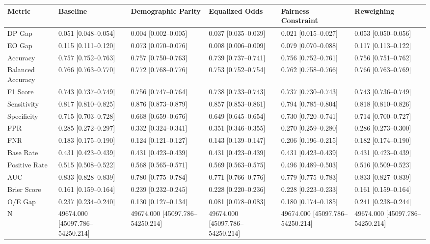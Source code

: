 \begin{tabular}{llllll}
\toprule
Metric & Baseline & Demographic Parity & Equalized Odds & Fairness Constraint & Reweighing \\
\midrule
DP Gap & 0.051 [0.048--0.054] & 0.004 [0.002--0.005] & 0.037 [0.035--0.039] & 0.021 [0.015--0.027] & 0.053 [0.050--0.056] \\
EO Gap & 0.115 [0.111--0.120] & 0.073 [0.070--0.076] & 0.008 [0.006--0.009] & 0.079 [0.070--0.088] & 0.117 [0.113--0.122] \\
Accuracy & 0.757 [0.752--0.763] & 0.757 [0.750--0.763] & 0.739 [0.737--0.741] & 0.756 [0.752--0.761] & 0.756 [0.751--0.762] \\
Balanced Accuracy & 0.766 [0.763--0.770] & 0.772 [0.768--0.776] & 0.753 [0.752--0.754] & 0.762 [0.758--0.766] & 0.766 [0.763--0.769] \\
F1 Score & 0.743 [0.737--0.749] & 0.756 [0.747--0.764] & 0.738 [0.733--0.743] & 0.737 [0.730--0.743] & 0.743 [0.736--0.749] \\
Sensitivity & 0.817 [0.810--0.825] & 0.876 [0.873--0.879] & 0.857 [0.853--0.861] & 0.794 [0.785--0.804] & 0.818 [0.810--0.826] \\
Specificity & 0.715 [0.703--0.728] & 0.668 [0.659--0.676] & 0.649 [0.645--0.654] & 0.730 [0.720--0.741] & 0.714 [0.700--0.727] \\
FPR & 0.285 [0.272--0.297] & 0.332 [0.324--0.341] & 0.351 [0.346--0.355] & 0.270 [0.259--0.280] & 0.286 [0.273--0.300] \\
FNR & 0.183 [0.175--0.190] & 0.124 [0.121--0.127] & 0.143 [0.139--0.147] & 0.206 [0.196--0.215] & 0.182 [0.174--0.190] \\
Base Rate & 0.431 [0.423--0.439] & 0.431 [0.423--0.439] & 0.431 [0.423--0.439] & 0.431 [0.423--0.439] & 0.431 [0.423--0.439] \\
Positive Rate & 0.515 [0.508--0.522] & 0.568 [0.565--0.571] & 0.569 [0.563--0.575] & 0.496 [0.489--0.503] & 0.516 [0.509--0.523] \\
AUC & 0.833 [0.828--0.839] & 0.780 [0.775--0.784] & 0.771 [0.766--0.776] & 0.779 [0.775--0.783] & 0.833 [0.827--0.839] \\
Brier Score & 0.161 [0.159--0.164] & 0.239 [0.232--0.245] & 0.228 [0.220--0.236] & 0.228 [0.223--0.233] & 0.161 [0.159--0.164] \\
O/E Gap & 0.237 [0.234--0.240] & 0.130 [0.127--0.134] & 0.081 [0.078--0.083] & 0.180 [0.174--0.185] & 0.241 [0.238--0.244] \\
N & 49674.000 [45097.786--54250.214] & 49674.000 [45097.786--54250.214] & 49674.000 [45097.786--54250.214] & 49674.000 [45097.786--54250.214] & 49674.000 [45097.786--54250.214] \\

\end{tabular}
